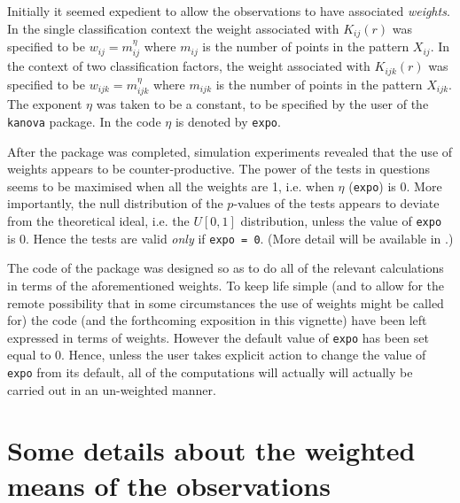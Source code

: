 \documentclass[12pt]{article}
\begin{document}
Initially it seemed expedient to allow the observations to have
associated \emph{weights}.  In the single classification context
the weight associated with $K_{ij}(r)$ was specified to be $w_{ij}
= m_{ij}^{\eta}$ where $m_{ij}$ is the number of points in the
pattern $X_{ij}$.  In the context of two classification factors,
the weight associated with $K_{ijk}(r)$ was specified to be $w_{ijk}
= m_{ijk}^{\eta}$ where $m_{ijk}$ is the number of points in the
pattern $X_{ijk}$.  The exponent $\eta$ was taken to be a constant,
to be specified by the user of the \texttt{kanova} package.  In the
code $\eta$ is denoted by \texttt{expo}.

After the package was completed, simulation experiments revealed that
the use of weights appears to be counter-productive.  The power of
the tests in questions seems to be maximised when all the weights
are 1, i.e. when $\eta$ (\texttt{expo}) is 0.  More importantly,
the null distribution of the $p$-values of the tests appears to
deviate from the theoretical ideal, i.e. the $U[0,1]$ distribution,
unless the value of \texttt{expo} is 0.  Hence the tests are valid
\emph{only} if \texttt{expo = 0}.  (More detail will be available
in \cite{DiggleTurner2025}.)

The code of the package was designed so as to do all of the
relevant calculations in terms of the aforementioned weights.
To keep life simple (and to allow for the remote possibility that
in some circumstances the use of weights might be called for) the
code (and the forthcoming exposition in this vignette) have been
left expressed in terms of weights.  However the default value of
\texttt{expo} has been set equal to 0.  Hence, unless the user
takes explicit action to change the value of \texttt{expo} from
its default, all of the computations will actually will actually
be carried out in an un-weighted manner.

\section{Some details about the weighted means of the observations}
\label{sec:wtdMeans}
\end{document}
